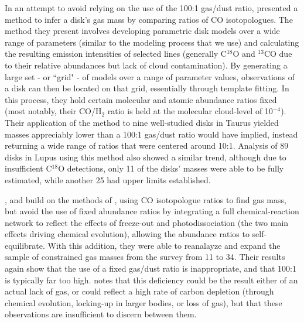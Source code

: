 In an attempt to avoid relying on the use of the 100:1 gas/dust ratio, \citet{WilliamsBest2014} presented a method to infer a disk's gas mass by comparing ratios of CO isotopologues. The method they present involves developing parametric disk models over a wide range of parameters (similar to the modeling process that we use) and calculating the resulting emission intensities of selected lines (generally C$^{18}$O and $^{13}$CO due to their relative abundances but lack of cloud contamination). By generating a large set - or ``grid" - of models over a range of parameter values, observations of a disk can then be located on that grid, essentially through template fitting. In this process, they hold certain molecular and atomic abundance ratios fixed (most notably, their CO/H$_2$ ratio is held at the molecular cloud-level of 10$^{-4}$). Their application of the method to nine well-studied disks in Taurus yielded masses appreciably lower than a 100:1 gas/dust ratio would have implied, instead returning a wide range of ratios that were centered around 10:1. Analysis of 89 disks in Lupus \citep{Ansdell2016} using this method also showed a similar trend, although due to insufficient C$^{18}$O detections, only 11 of the disks' masses were able to be fully estimated, while another 25 had upper limits established.

\citet{Miotello2014}, \citet{Miotello2016} and \citet{Miotello2017} build on the methods of \citet{WilliamsBest2014}, using CO isotopologue ratios to find gas mass, but avoid the use of fixed abundance ratios by integrating a full chemical-reaction network to reflect the effects of freeze-out and photodissociation (the two main effects driving chemical evolution), allowing the abundance ratios to self-equilibrate. With this addition, they were able to reanalayze and expand the sample of constrained gas masses from the \citet{Ansdell2016} survey from 11 to 34. Their results again show that the use of a fixed gas/dust ratio is inappropriate, and that 100:1 is typically far too high. \citet{Miotello2017} notes that this deficiency could be the result either of an actual lack of gas, or could reflect a high rate of carbon depletion (through chemical evolution, locking-up in larger bodies, or loss of gas), but that these observations are insufficient to discern between them.


